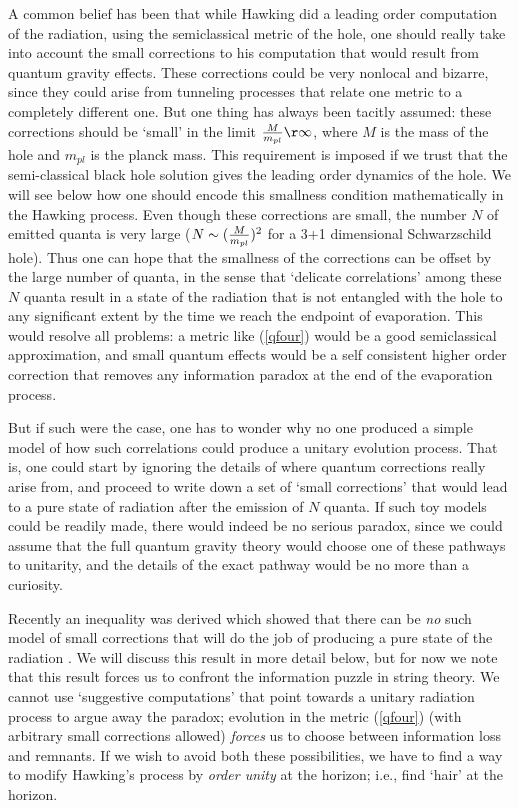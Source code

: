 \documentclass[11pt]{article}
\begin{document}
A common belief has been that while Hawking did a leading order computation of the radiation, using the semiclassical metric of the hole, one should really take into account the small corrections to his computation that would result from quantum gravity effects.  These corrections could be very nonlocal and bizarre, since they could arise from tunneling processes that relate one metric to a completely different one. But one thing has always been tacitly assumed: these corrections should be `small' in the limit  ${M\over m_{pl}}\r \infty$, where $M$ is the mass of the hole and $m_{pl}$ is the planck mass. This requirement is imposed if we trust that the semi-classical black hole solution gives the leading order dynamics of the hole.  We will see below how one should encode this smallness condition mathematically in the Hawking process. Even though these corrections 
are small, the number $N$ of emitted quanta is very large
($N\sim ({M\over m_{pl}})^2$ for a 3+1 dimensional Schwarzschild hole). Thus one can hope that the smallness of the corrections can be offset by the large number of quanta, in the sense that `delicate correlations' among these $N$ quanta result in a state of the radiation that is not entangled with the hole to any significant extent by the time we reach the endpoint of evaporation. This would resolve all problems: a metric like (\ref{qfour}) would be a good semiclassical approximation, and small quantum effects would be a self consistent higher order correction that removes any information paradox at the end of the evaporation process.

But if such were the case, one has to wonder why no one produced a simple model of how such correlations could produce a unitary evolution process. That is, one could start by ignoring the details of where quantum corrections really arise from, and proceed to write down a set of `small corrections' that would lead to a pure state of radiation after the emission of $N$ quanta. If such toy models could be readily made, there would indeed be no serious paradox, since we could assume that the full quantum gravity theory would choose one of these pathways to unitarity, and the details of the exact pathway would be no more than a curiosity. 

Recently an inequality was derived which showed that there can be {\it no} such model of small corrections that will do the job of producing a pure state of the radiation \cite{mathurfuzz}. We will discuss this result in more detail below, but for now we note that this result forces us to confront the information puzzle in string theory. We cannot use `suggestive computations' that point towards a unitary radiation process to argue away the paradox; evolution in the  metric (\ref{qfour}) (with arbitrary small corrections allowed) {\it forces} us to choose between  information loss and remnants. If we wish to avoid both these possibilities, we have to find a way to modify Hawking's process by {\it order unity} at the horizon; i.e., find `hair' at the horizon. 
\end{document}
